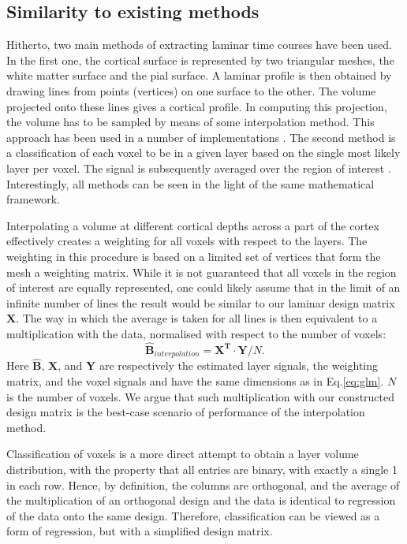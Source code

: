\subsection{Similarity to existing methods} 
Hitherto, two main methods of extracting laminar time courses have been used. In the first one, the cortical surface is represented by two triangular meshes, the white matter surface and the pial surface. A laminar profile is then obtained by drawing lines from points (vertices) on one surface to the other. The volume projected onto these lines gives a cortical profile. In computing this projection, the volume has to be sampled by means of some interpolation method. This approach has been used in a number of implementations  \cite{Koopmans2011,Polimeni2010,DeMartino2013}. The second method is a classification of each voxel to be in a given layer based on the single most likely layer per voxel. The signal is subsequently averaged over the region of interest \cite{Siero2011,Olman2012,Maass2014}. Interestingly, all methods can be seen in the light of the same mathematical framework. 

Interpolating a volume at different cortical depths across a part of the cortex effectively creates a weighting for all voxels with respect to the layers. 
The weighting in this procedure is based on a limited set of vertices that form the mesh a weighting matrix. While it is not guaranteed that all voxels in the region of interest are equally represented, one could likely assume that in the limit of an infinite number of lines the result would be similar to our laminar design matrix $\mathbf{X}$. The way in which the average is taken for all lines is then equivalent to a multiplication with the data, normalised with respect to the number of voxels:
\begin{equation}
\hat{\mathbf{B}}_{interpolation}= \mathbf{X^T} \cdot \mathbf{Y} / N. 
\end{equation}
Here $\hat{\mathbf{B}}$, $\mathbf{X}$, and $\mathbf{Y}$ are respectively the estimated layer signals, the weighting matrix, and the voxel signals and have the same dimensions as in Eq.\ref{eq:glm}. $N$ is the number of voxels. We argue that such multiplication with our constructed design matrix is the best-case scenario of performance of the interpolation method.

Classification of voxels is a more direct attempt to obtain a layer volume distribution, with the property that all entries are binary, with exactly a single 1 in each row. Hence, by definition, the columns are orthogonal, and the average of the multiplication of an orthogonal design and the data is identical to regression of the data onto the same design. Therefore, classification can be viewed as a form of regression, but with a simplified design matrix. 

